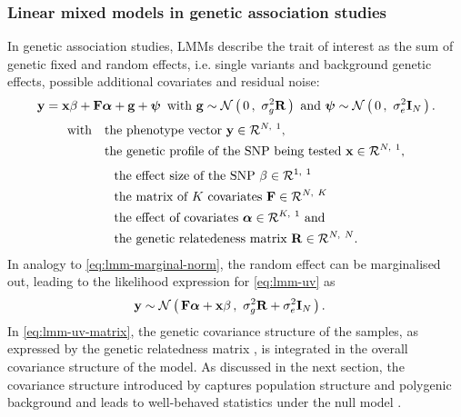 \subsubsection{Linear mixed models in genetic association studies}
\label{subsection:lmm-genetics}
In genetic association studies, LMMs describe the trait of interest as the sum of genetic fixed and random effects, i.e. single variants and background genetic effects, possible additional covariates and residual noise: 
%
\begin{equation}
\boldsymbol{\mathbf{y}} =\boldsymbol{\mathbf{x}}\beta + \boldsymbol{\mathbf{F}}\boldsymbol{\mathbf{\alpha}} + \boldsymbol{\mathbf{g}}+\boldsymbol{\mathbf{\psi}} \, \text{ with } \boldsymbol{\mathbf{g}} \sim \mathcal{N}\left(\,{0}\,,~{\sigma_g^2\boldsymbol{\mathbf{R}}}\,\right) \text{ and } \boldsymbol{\mathbf{\psi}} \sim\mathcal{N}\left(\,{0}\,,~{\sigma_e^2\boldsymbol{\mathbf{I}}_N}\,\right).
\label{eq:lmm-uv}
\end{equation}
%
\begin{align*} 
\text{with }\,\,\,\,& \text{the phenotype vector }\boldsymbol{\mathbf{y}} \in \mathcal{R}^{N,~1},\\
& \text{the genetic profile of the SNP being tested }\boldsymbol{\mathbf{x}} \in \mathcal{R}^{N,~1},
\end{align*} %
\begin{align*}
& \text{the effect size of the SNP } \beta \in \mathcal{R}^{1,~1}\\ 
& \text{the matrix of $K$ covariates }\boldsymbol{\mathbf{F}} \in \mathcal{R}^{N,~K}\\ 
& \text{the effect of covariates } \boldsymbol{\mathbf{\alpha}} \in \mathcal{R}^{K,~1} \text{ and}\\
& \text{the genetic relatedeness matrix }\boldsymbol{\mathbf{R}} \in \mathcal{R}^{N,~N}.
\end{align*} 
%
In analogy to \cref{eq:lmm-marginal-norm}, the random effect  can be marginalised out, leading to the likelihood expression for \cref{eq:lmm-uv} as
\begin{align}
\boldsymbol{\mathbf{y}} &\sim \mathcal{N}\left(\,{\boldsymbol{\mathbf{F}}\boldsymbol{\mathbf{\alpha}} +\boldsymbol{\mathbf{x}}\beta}\,,~{\sigma_g^2\boldsymbol{\mathbf{R}} + \sigma_e^2\boldsymbol{\mathbf{I}}_N}\,\right).
\label{eq:lmm-uv-matrix}
\end{align}
%
In \cref{eq:lmm-uv-matrix}, the genetic covariance structure of the samples, as expressed by the genetic relatedness matrix , is integrated in the overall covariance structure of the model. As discussed in the next section, the covariance structure introduced by  captures population structure and polygenic background and leads to well-behaved statistics under the null model \citep{Yu2006,Kang2008}.

